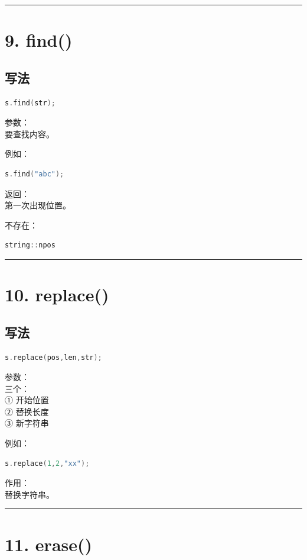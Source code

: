 \documentclass[10pt,twocolumn]{extarticle}
\begin{document}
\noindent\rule{\linewidth}{0.4pt}

\section{9. find()}

\subsection{写法}
\begin{lstlisting}[language=C++]
s.find(str);
\end{lstlisting}
参数：\\
要查找内容。

例如：
\begin{lstlisting}[language=C++]
s.find("abc");
\end{lstlisting}
返回：\\
第一次出现位置。

不存在：
\begin{lstlisting}[language=C++]
string::npos
\end{lstlisting}

\noindent\rule{\linewidth}{0.4pt}

\section{10. replace()}

\subsection{写法}
\begin{lstlisting}[language=C++]
s.replace(pos,len,str);
\end{lstlisting}
参数：\\
三个：\\
① 开始位置\\
② 替换长度\\
③ 新字符串

例如：
\begin{lstlisting}[language=C++]
s.replace(1,2,"xx");
\end{lstlisting}
作用：\\
替换字符串。

\noindent\rule{\linewidth}{0.4pt}

\section{11. erase()}
\end{document}
